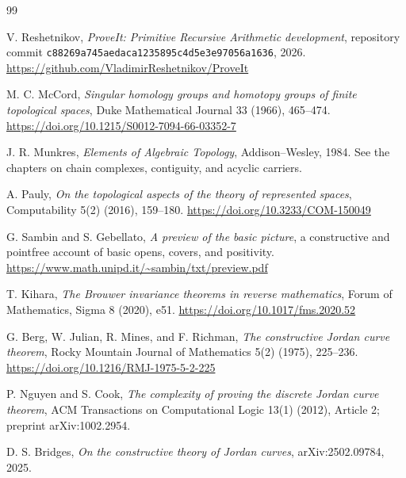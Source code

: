 \documentclass[11pt,oneside]{article}
\theoremstyle{definition}
\theoremstyle{remark}
\newcommand{\code}[1]{\texttt{#1}}
\begin{document}
\tableofcontents
\clearpage













\appendix




\begin{thebibliography}{99}

V. Reshetnikov,
\emph{ProveIt: Primitive Recursive Arithmetic development},
repository commit \code{c88269a745aedaca1235895c4d5e3e97056a1636}, 2026.
\url{https://github.com/VladimirReshetnikov/ProveIt}

M. C. McCord,
\emph{Singular homology groups and homotopy groups of finite topological spaces},
Duke Mathematical Journal 33 (1966), 465--474.
\url{https://doi.org/10.1215/S0012-7094-66-03352-7}

J. R. Munkres,
\emph{Elements of Algebraic Topology},
Addison--Wesley, 1984.  See the chapters on chain complexes, contiguity, and acyclic carriers.

A. Pauly,
\emph{On the topological aspects of the theory of represented spaces},
Computability 5(2) (2016), 159--180.
\url{https://doi.org/10.3233/COM-150049}

G. Sambin and S. Gebellato,
\emph{A preview of the basic picture},
a constructive and pointfree account of basic opens, covers, and positivity.
\url{https://www.math.unipd.it/~sambin/txt/preview.pdf}

T. Kihara,
\emph{The Brouwer invariance theorems in reverse mathematics},
Forum of Mathematics, Sigma 8 (2020), e51.
\url{https://doi.org/10.1017/fms.2020.52}

G. Berg, W. Julian, R. Mines, and F. Richman,
\emph{The constructive Jordan curve theorem},
Rocky Mountain Journal of Mathematics 5(2) (1975), 225--236.
\url{https://doi.org/10.1216/RMJ-1975-5-2-225}

P. Nguyen and S. Cook,
\emph{The complexity of proving the discrete Jordan curve theorem},
ACM Transactions on Computational Logic 13(1) (2012), Article 2; preprint arXiv:1002.2954.

D. S. Bridges,
\emph{On the constructive theory of Jordan curves},
arXiv:2502.09784, 2025.

\end{thebibliography}
\end{document}
